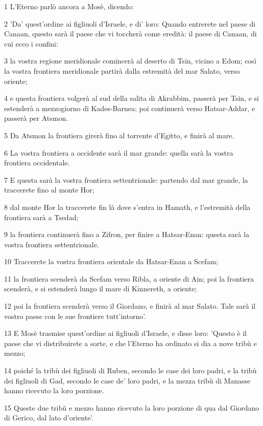 \par 1 L'Eterno parlò ancora a Mosè, dicendo:
\par 2 'Da' quest'ordine ai figliuoli d'Israele, e di' loro: Quando entrerete nel paese di Canaan, questo sarà il paese che vi toccherà come eredità: il paese di Canaan, di cui ecco i confini:
\par 3 la vostra regione meridionale comincerà al deserto di Tsin, vicino a Edom; così la vostra frontiera meridionale partirà dalla estremità del mar Salato, verso oriente;
\par 4 e questa frontiera volgerà al sud della salita di Akrabbim, passerà per Tsin, e si estenderà a mezzogiorno di Kades-Barnea; poi continuerà verso Hatsar-Addar, e passerà per Atsmon.
\par 5 Da Atsmon la frontiera girerà fino al torrente d'Egitto, e finirà al mare.
\par 6 La vostra frontiera a occidente sarà il mar grande: quella sarà la vostra frontiera occidentale.
\par 7 E questa sarà la vostra frontiera settentrionale: partendo dal mar grande, la traccerete fino al monte Hor;
\par 8 dal monte Hor la traccerete fin là dove s'entra in Hamath, e l'estremità della frontiera sarà a Tsedad;
\par 9 la frontiera continuerà fino a Zifron, per finire a Hatsar-Enan: questa sarà la vostra frontiera settentrionale.
\par 10 Traccerete la vostra frontiera orientale da Hatsar-Enan a Scefam;
\par 11 la frontiera scenderà da Scefam verso Ribla, a oriente di Ain; poi la frontiera scenderà, e si estenderà lungo il mare di Kinnereth, a oriente;
\par 12 poi la frontiera scenderà verso il Giordano, e finirà al mar Salato. Tale sarà il vostro paese con le sue frontiere tutt'intorno'.
\par 13 E Mosè trasmise quest'ordine ai figliuoli d'Israele, e disse loro: 'Questo è il paese che vi distribuirete a sorte, e che l'Eterno ha ordinato si dia a nove tribù e mezzo;
\par 14 poiché la tribù dei figliuoli di Ruben, secondo le case dei loro padri, e la tribù dei figliuoli di Gad, secondo le case de' loro padri, e la mezza tribù di Manasse hanno ricevuto la loro porzione.
\par 15 Queste due tribù e mezzo hanno ricevuto la loro porzione di qua dal Giordano di Gerico, dal lato d'oriente'.
